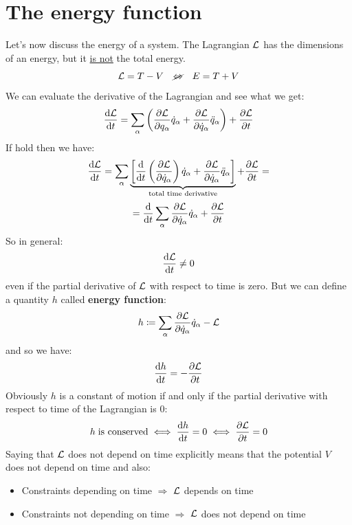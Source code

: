\section{The energy function}
Let's now discuss the energy of a system. The Lagrangian $\mathcal{L}$ has the dimensions of an energy, but it \underline{is not} the total energy.
\begin{equation}
    \mathcal{L} = T - V \quad \cancel{\Leftrightarrow} \quad E = T + V
\end{equation}
We can evaluate the derivative of the Lagrangian and see what we get:
\begin{equation}
    \dfrac{\dd{\lagr}}{\dd{t}} = \bigsum_{\alpha}\brackets{\pdv{\lagr}{q_{\alpha}}\dot{q}_{\alpha} + \pdv{\lagr}{\dot{q}_{\alpha}}\ddot{q}_{\alpha}} + \pdv{ \lagr}{ t}
\end{equation}
If \eleref\;hold then we have:
\begin{equation}
    \dfrac{\dd{\lagr}}{\dd{t}} = \bigsum_{\alpha}\underbrace{\sqbr{\dv{}{t}\brackets{\pdv{\lagr}{\dot{q}_{\alpha}}}\dot{q}_{\alpha} + \pdv{\lagr}{\dot{q}_{\alpha}}\ddot{q}_{\alpha}}}_{\text{total time derivative}} + \pdv{ \lagr}{ t} =
\end{equation}
\begin{equation}
 = \dv{}{t}\bigsum_{\alpha}\pdv{\lagr}{\dot{q}_{\alpha}}\dot{q}_{\alpha} + \pdv{ \lagr}{ t}
\end{equation}
So in general:
\begin{equation}
    \dfrac{\dd{\mathcal{L}}}{\dd{t}} \neq 0
\end{equation}
even if the partial derivative of $\mathcal{L}$ with respect to time is zero. But we can define a quantity $h$ called \textbf{energy function}:
\begin{equation}
    h \defineeq \bigsum_{\alpha}\pdv{\lagr}{\dot{q}_{\alpha}}\dot{q}_{\alpha} - \lagr
\end{equation}
and so we have:
\begin{equation}
    \dfrac{\dd{h}}{\dd{t}} = -\pdv{ \lagr}{ t}
\end{equation}
Obviously $h$ is a constant of motion if and only if the partial derivative with respect to time of the Lagrangian is 0:
\begin{equation}
    h\;\text{is conserved} \iff \dfrac{\dd{h}}{\dd{t}} = 0 \iff \pdv{ \lagr}{ t} = 0
\end{equation}
Saying that $\mathcal{L}$ does not depend on time explicitly means that the potential $V$ does not depend on time and also:
\begin{itemize}
    \item Constraints depending on time $\Rightarrow$ $\mathcal{L}$ depends on time
    \item Constraints not depending on time $\Rightarrow$ $\mathcal{L}$ does not depend on time
\end{itemize}
